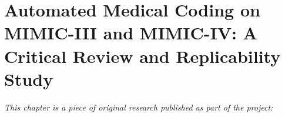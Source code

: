 
\chapter[automated medical coding on mimic-iii and mimic-iv: a critical review and replicability study]{Automated Medical Coding on MIMIC-III and MIMIC-IV: A Critical Review and Replicability Study}
\label{chp:paper-automated}

\textit{This chapter is a piece of original research published as part of the project:} \newline
\begin{center}
    \begin{enumerate}[leftmargin=8mm,rightmargin=8mm,topsep=0mm,label={[\Alph*]}]
        \setcounter{enumi}{4}
        \item {} \co \. \parencite{edin_automated_2023}
        \end{enumerate}
\end{center}

